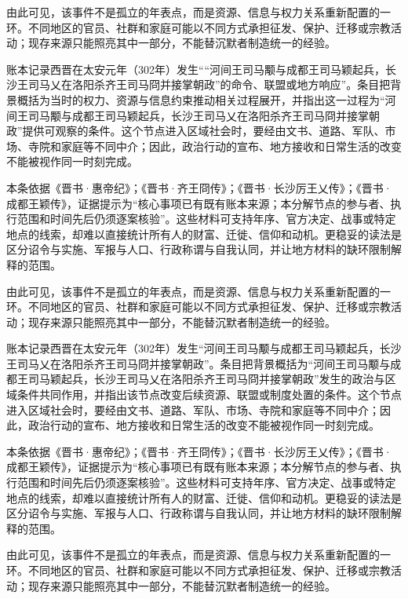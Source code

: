 由此可见，该事件不是孤立的年表点，而是资源、信息与权力关系重新配置的一环。不同地区的官员、社群和家庭可能以不同方式承担征发、保护、迁移或宗教活动；现存来源只能照亮其中一部分，不能替沉默者制造统一的经验。

账本记录西晋在太安元年（302年）发生““河间王司马颙与成都王司马颖起兵，长沙王司马乂在洛阳杀齐王司马冏并接掌朝政”的命令、联盟或地方响应”。条目把背景概括为当时的权力、资源与信息约束推动相关过程展开，并指出这一过程为“河间王司马颙与成都王司马颖起兵，长沙王司马乂在洛阳杀齐王司马冏并接掌朝政”提供可观察的条件。这个节点进入区域社会时，要经由文书、道路、军队、市场、寺院和家庭等不同中介；因此，政治行动的宣布、地方接收和日常生活的改变不能被视作同一时刻完成。

本条依据《晋书·惠帝纪》；《晋书·齐王冏传》；《晋书·长沙厉王乂传》；《晋书·成都王颖传》，证据提示为“核心事项已有既有账本来源；本分解节点的参与者、执行范围和时间先后仍须逐案核验”。这些材料可支持年序、官方决定、战事或特定地点的线索，却难以直接统计所有人的财富、迁徙、信仰和动机。更稳妥的读法是区分诏令与实施、军报与人口、行政称谓与自我认同，并让地方材料的缺环限制解释的范围。

由此可见，该事件不是孤立的年表点，而是资源、信息与权力关系重新配置的一环。不同地区的官员、社群和家庭可能以不同方式承担征发、保护、迁移或宗教活动；现存来源只能照亮其中一部分，不能替沉默者制造统一的经验。

账本记录西晋在太安元年（302年）发生“河间王司马颙与成都王司马颖起兵，长沙王司马乂在洛阳杀齐王司马冏并接掌朝政”。条目把背景概括为“河间王司马颙与成都王司马颖起兵，长沙王司马乂在洛阳杀齐王司马冏并接掌朝政”发生的政治与区域条件共同作用，并指出该节点改变后续资源、联盟或制度处置的条件。这个节点进入区域社会时，要经由文书、道路、军队、市场、寺院和家庭等不同中介；因此，政治行动的宣布、地方接收和日常生活的改变不能被视作同一时刻完成。

本条依据《晋书·惠帝纪》；《晋书·齐王冏传》；《晋书·长沙厉王乂传》；《晋书·成都王颖传》，证据提示为“核心事项已有既有账本来源；本分解节点的参与者、执行范围和时间先后仍须逐案核验”。这些材料可支持年序、官方决定、战事或特定地点的线索，却难以直接统计所有人的财富、迁徙、信仰和动机。更稳妥的读法是区分诏令与实施、军报与人口、行政称谓与自我认同，并让地方材料的缺环限制解释的范围。

由此可见，该事件不是孤立的年表点，而是资源、信息与权力关系重新配置的一环。不同地区的官员、社群和家庭可能以不同方式承担征发、保护、迁移或宗教活动；现存来源只能照亮其中一部分，不能替沉默者制造统一的经验。

